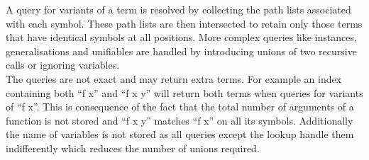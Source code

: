 A query for variants of a term is resolved by collecting the path lists associated with each symbol. These path lists are then intersected to retain only those terms that have identical symbols at all positions. More complex queries like instances, generalisations and unifiables are handled by introducing unions of two recursive calls or ignoring variables.\\
The queries are not exact and may return extra terms. For example an index containing both ``f x'' and ``f x y'' will return both terms when queries for variants of ``f x''. This is consequence of the fact that the total number of arguments of a function is not stored and ``f x y'' matches ``f x'' on all its symbols. Additionally the name of variables is not stored as all queries except the lookup handle them indifferently which reduces the number of unions required.\\
